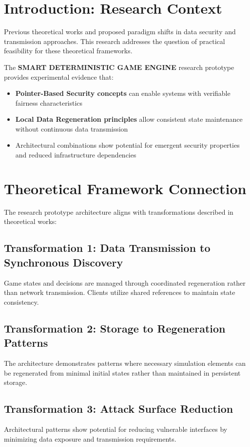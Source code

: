 \documentclass[14pt, a4paper]{extarticle}
\begin{document}
\section{Introduction: Research Context}

Previous theoretical works \cite{suvorov2025pointer} and \cite{suvorov2025local} proposed paradigm shifts in data security and transmission approaches. This research addresses the question of practical feasibility for these theoretical frameworks.

The \textbf{SMART DETERMINISTIC GAME ENGINE} research prototype provides experimental evidence that:
\begin{itemize}
    \item \textbf{Pointer-Based Security concepts} can enable systems with verifiable fairness characteristics
    \item \textbf{Local Data Regeneration principles} allow consistent state maintenance without continuous data transmission
    \item Architectural combinations show potential for emergent security properties and reduced infrastructure dependencies
\end{itemize}

\section{Theoretical Framework Connection}

The research prototype architecture aligns with transformations described in theoretical works:

\subsection{Transformation 1: Data Transmission to Synchronous Discovery}
Game states and decisions are managed through coordinated regeneration rather than network transmission. Clients utilize shared references to maintain state consistency.

\subsection{Transformation 2: Storage to Regeneration Patterns}
The architecture demonstrates patterns where necessary simulation elements can be regenerated from minimal initial states rather than maintained in persistent storage.

\subsection{Transformation 3: Attack Surface Reduction}
Architectural patterns show potential for reducing vulnerable interfaces by minimizing data exposure and transmission requirements.
\end{document}
